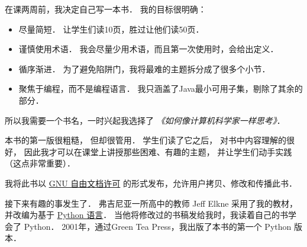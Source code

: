 在课两周前，我决定自己写一本书． 我的目标很明确：

\begin{itemize}

\item 尽量简短． 让学生们读10页，胜过让他们读50页．

\item 谨慎使用术语． 我会尽量少用术语，而且第一次使用时，会给出定义．

\item 循序渐进． 为了避免陷阱门，我将最难的主题拆分成了很多个小节．

\item 聚焦于编程，而不是编程语言． 我只涵盖了Java最小可用子集，剔除了其余的部分．

\end{itemize}


所以我需要一个书名，一时兴起我选择了 \emph{《如何像计算机科学家一样思考》}．


本书的第一版很粗糙， 但却很管用．
学生们读了它之后， 对书中内容理解的很好， 因此我才可以在课堂上讲授那些困难、有趣的主题， 并让学生们动手实践（这点非常重要）．


我将此书以 \href{https://en.wikipedia.org/wiki/GNU_Free_Documentation_License}{GNU 自由文档许可} 的形式发布，允许用户拷贝、修改和传播此书．
 


接下来有趣的事发生了． 弗吉尼亚一所高中的教师 Jeff Elkne 采用了我的教材， 并改编为基于 \href{http://www.python.org/}{Python 语言}．
当他将修改过的书稿发给我时，我读着自己的书学会了 Python．
2001年，通过Green Tea Press，我出版了本书的第一个 Python 版本．

